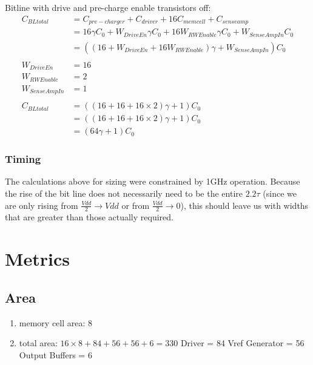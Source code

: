 \documentclass[a4paper]{article}
\begin{document}
Bitline with drive and pre-charge enable transistors off:
\begin{align*}
C_{BLtotal} &= C_{pre-charger} + C_{driver} + 16 C_{memcell} + C_{senseamp}\\
&= 16 \gamma C_0 + W_{DriveEn}\gamma C_0 + 16 W_{RWEnable}\gamma C_0 + W_{SenseAmpIn} C_0\\
&= ((16 + W_{DriveEn}  + 16 W_{RWEnable})\gamma + W_{SenseAmpIn})C_0\\\\
W_{DriveEn} &= 16\\
W_{RWEnable} &= 2\\
W_{SenseAmpIn} &= 1\\\\
C_{BLtotal} &= ((16 + 16  + 16 \times 2)\gamma + 1)C_0\\
&= ((16 + 16  + 16 \times 2)\gamma + 1)C_0\\
&= (64\gamma + 1) C_0
\end{align*}

\subsubsection{Timing}
\label{subsec:time_calc}
The calculations above for sizing were constrained by 1GHz operation. Because the rise of the bit line does not necessarily need to be the entire $2.2\tau$ (since we are only rising from $\frac{Vdd}{2} \rightarrow Vdd$ or from $\frac{Vdd}{2} \rightarrow 0$), this should leave us with widths that are greater than those actually required.



\section{Metrics}
\label{sec:metrics}

\subsection{Area}
\begin{enumerate}
\item memory cell area: 8
\item total area: $16 \times 8 + 84 + 56 + 56 + 6 = 330$
\subitem Driver = 84
\subitem Vref Generator = 56
\subitem Output Buffers = 6
\end{enumerate}
\end{document}
